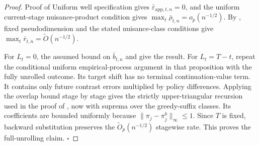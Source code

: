 \documentclass[opre,nonblindrev]{informs4}
\newcommand{\norm}[1]{\lVert#1\rVert}
\renewcommand{\qed}{\unskip\nobreak\hfill\ensuremath{\square}}
\begin{document}
\begin{proof}{Proof of }
Uniform well specification gives $\bar\varepsilon_{\mathrm{app},t,n}=0$, and the uniform
current-stage nuisance-product condition gives
$\max_t\bar\rho_{t,n}=o_p(n^{-1/2})$. By , fixed
pseudodimension and the stated nuisance-class conditions give
$\max_t\bar r_{t,n}=\widetilde O(n^{-1/2})$.

For $L_t=0$, the assumed bound on $\bar b_{t,n}$ and
 give the result. For $L_t=T-t$, repeat the
conditional uniform empirical-process argument in that proposition with the
fully unrolled outcome. Its target shift has no terminal continuation-value
term. It contains only future contrast errors multiplied by policy differences.
Applying the overlap bound stage by stage gives the strictly upper-triangular
recursion used in the proof of , now with
suprema over the greedy-suffix classes. Its coefficients are bounded uniformly because
$\norm{\pi_j-\pi_j^b}_\infty\leq1$. Since $T$ is fixed, backward substitution
preserves the $\widetilde O_p(n^{-1/2})$ stagewise rate. This proves the
full-unrolling claim. \qed
\end{proof}
\end{document}
